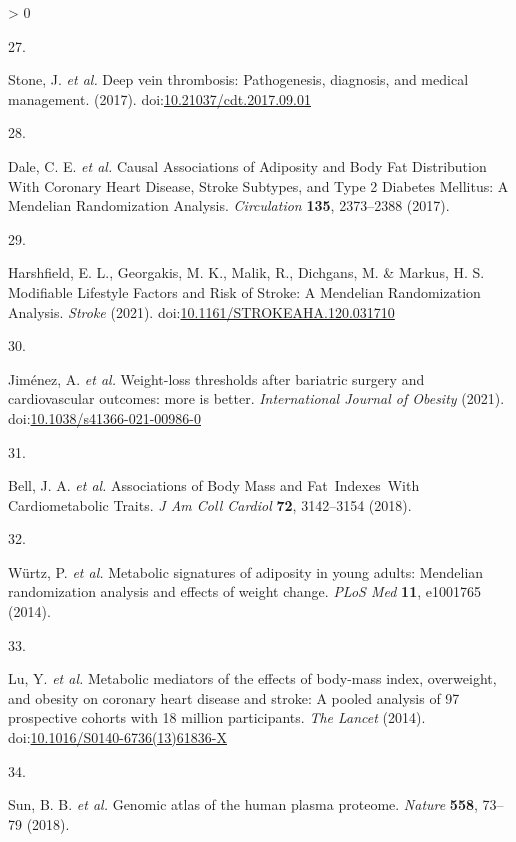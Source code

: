 \documentclass[11pt,twoside]{bristolthesis}
\newlength{\cslhangindent}
\newlength{\csllabelwidth}
\newenvironment{CSLReferences}[2] %
 {%
  \setlength{\parindent}{0pt}
  \ifodd #1 \everypar{\setlength{\hangindent}{\cslhangindent}}\ignorespaces\fi
  \ifnum #2 > 0
  \setlength{\parskip}{#2\baselineskip}
  \fi
 }%
 {}
\newcommand{\CSLLeftMargin}[1]{\parbox[t]{\csllabelwidth}{#1}}
\newcommand{\CSLRightInline}[1]{\parbox[t]{\linewidth - \csllabelwidth}{#1}\break}
\begin{document}
\begin{CSLReferences}{0}{0}
\leavevmode\hypertarget{ref-Stone2017}{}%
\CSLLeftMargin{27. }
\CSLRightInline{Stone, J. \emph{et al.} {Deep vein thrombosis: Pathogenesis, diagnosis, and medical management}. (2017). doi:\href{https://doi.org/10.21037/cdt.2017.09.01}{10.21037/cdt.2017.09.01}}

\leavevmode\hypertarget{ref-Dale2017}{}%
\CSLLeftMargin{28. }
\CSLRightInline{Dale, C. E. \emph{et al.} {Causal Associations of Adiposity and Body Fat Distribution With Coronary Heart Disease, Stroke Subtypes, and Type 2 Diabetes Mellitus: A Mendelian Randomization Analysis}. \emph{Circulation} \textbf{135}, 2373--2388 (2017).}

\leavevmode\hypertarget{ref-Harshfield2021}{}%
\CSLLeftMargin{29. }
\CSLRightInline{Harshfield, E. L., Georgakis, M. K., Malik, R., Dichgans, M. \& Markus, H. S. {Modifiable Lifestyle Factors and Risk of Stroke: A Mendelian Randomization Analysis}. \emph{Stroke} (2021). doi:\href{https://doi.org/10.1161/STROKEAHA.120.031710}{10.1161/STROKEAHA.120.031710}}

\leavevmode\hypertarget{ref-Jimenez2021}{}%
\CSLLeftMargin{30. }
\CSLRightInline{Jiménez, A. \emph{et al.} {Weight-loss thresholds after bariatric surgery and cardiovascular outcomes: more is better}. \emph{International Journal of Obesity} (2021). doi:\href{https://doi.org/10.1038/s41366-021-00986-0}{10.1038/s41366-021-00986-0}}

\leavevmode\hypertarget{ref-Bell2018a}{}%
\CSLLeftMargin{31. }
\CSLRightInline{Bell, J. A. \emph{et al.} {Associations of Body Mass and Fat~Indexes~With Cardiometabolic Traits}. \emph{J Am Coll Cardiol} \textbf{72}, 3142--3154 (2018).}

\leavevmode\hypertarget{ref-Wurtz2014}{}%
\CSLLeftMargin{32. }
\CSLRightInline{Würtz, P. \emph{et al.} {Metabolic signatures of adiposity in young adults: Mendelian randomization analysis and effects of weight change}. \emph{PLoS Med} \textbf{11}, e1001765 (2014).}

\leavevmode\hypertarget{ref-Lu2014}{}%
\CSLLeftMargin{33. }
\CSLRightInline{Lu, Y. \emph{et al.} {Metabolic mediators of the effects of body-mass index, overweight, and obesity on coronary heart disease and stroke: A pooled analysis of 97 prospective cohorts with 1{{}}8 million participants}. \emph{The Lancet} (2014). doi:\href{https://doi.org/10.1016/S0140-6736(13)61836-X}{10.1016/S0140-6736(13)61836-X}}

\leavevmode\hypertarget{ref-Sun2018}{}%
\CSLLeftMargin{34. }
\CSLRightInline{Sun, B. B. \emph{et al.} {Genomic atlas of the human plasma proteome}. \emph{Nature} \textbf{558}, 73--79 (2018).}


\end{CSLReferences}
\end{document}

